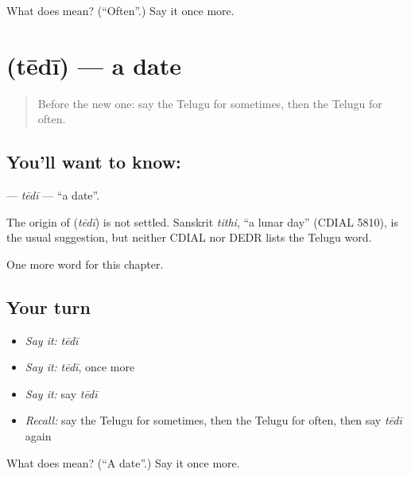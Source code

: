 \begin{tcolorbox}[breakable,colback=teal!4,colframe=teal!35!black,title={Before you move on}]
What does  mean? (\textquotedblleft{}Often\textquotedblright{}.) Say it once more.
\end{tcolorbox}
\section[\texorpdfstring{\te{తేదీ} (tēdī)}{తేదీ (tēdī)}]{ (tēdī) — a date}

\label{lesson:TE-C170-tedi}



\begin{quote}
Before the new one: say the Telugu for sometimes, then the Telugu for often.
\end{quote}

\subsection*{You'll want to know: }
\textbf{} — \emph{tēdī} — \textquotedblleft{}a date\textquotedblright{}.

\begin{cousinweb}
The origin of \textbf{} (\emph{tēdī}) is not settled. Sanskrit \emph{tithi}, \textquotedblleft{}a lunar day\textquotedblright{} (CDIAL 5810), is the usual suggestion, but neither CDIAL nor DEDR lists the Telugu word.
\end{cousinweb}

\begin{grammarlens}[title={What you've built}]
One more word for this chapter.
\end{grammarlens}

\subsection*{Your turn}
\begin{itemize}
\raggedright
  \item \emph{Say it:} \emph{tēdī}
  \item \emph{Say it:} \emph{tēdī}, once more
  \item \emph{Say it:} say \emph{tēdī}
  \item \emph{Recall:} say the Telugu for sometimes, then the Telugu for often, then say \emph{tēdī} again
\end{itemize}

\begin{tcolorbox}[breakable,colback=teal!4,colframe=teal!35!black,title={Before you move on}]
What does  mean? (\textquotedblleft{}A date\textquotedblright{}.) Say it once more.
\end{tcolorbox}
